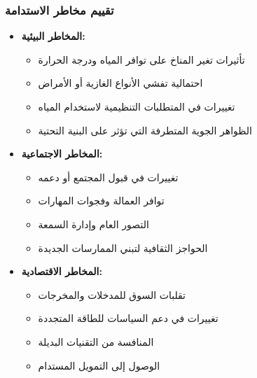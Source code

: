 \subsubsection{تقييم مخاطر الاستدامة}
\begin{itemize}
    \item \textbf{المخاطر البيئية:}
    \begin{itemize}
        \item تأثيرات تغير المناخ على توافر المياه ودرجة الحرارة
        \item احتمالية تفشي الأنواع الغازية أو الأمراض
        \item تغييرات في المتطلبات التنظيمية لاستخدام المياه
        \item الظواهر الجوية المتطرفة التي تؤثر على البنية التحتية
    \end{itemize}
    
    \item \textbf{المخاطر الاجتماعية:}
    \begin{itemize}
        \item تغييرات في قبول المجتمع أو دعمه
        \item توافر العمالة وفجوات المهارات
        \item التصور العام وإدارة السمعة
        \item الحواجز الثقافية لتبني الممارسات الجديدة
    \end{itemize}
    
    \item \textbf{المخاطر الاقتصادية:}
    \begin{itemize}
        \item تقلبات السوق للمدخلات والمخرجات
        \item تغييرات في دعم السياسات للطاقة المتجددة
        \item المنافسة من التقنيات البديلة
        \item الوصول إلى التمويل المستدام
    \end{itemize}
\end{itemize}

